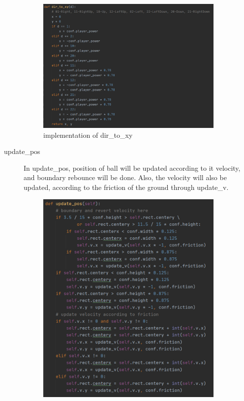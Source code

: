 \documentclass[14pt]{extarticle}
\begin{document}
\begin{description}
\begin{figure}[H]
\begin{center}
			\includegraphics[width=0.9\textwidth]{dir_to_xy}
			\caption{implementation of dir\_to\_xy}
		\end{center}
	\end{figure}
	\item[update\_pos]
	In update\_pos, position of ball will be updated according to it velocity, and boundary rebounce will be done. Also, the velocity will also be updated, according to the friction of the ground through update\_v.
	\begin{figure}[H]
		\begin{center}
			\includegraphics[width=0.9\textwidth]{Ball_update_pos}

\end{center}
\end{figure}
\end{description}
\end{document}

